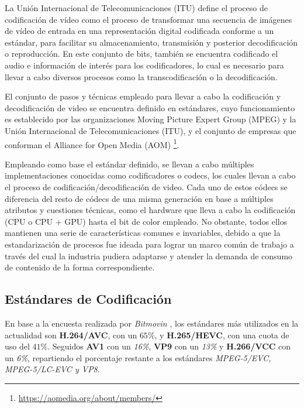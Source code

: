  La Unión Internacional de Telecomunicaciones (ITU) \cite{video-encoding-definition} define el proceso de codificación de vídeo como el proceso de transformar una secuencia de imágenes de vídeo de entrada en una representación digital codificada conforme a un estándar, para facilitar su almacenamiento, transmisión y posterior decodificación o reproducción. En este conjunto de bits, también se encuentra codificado el audio e información de interés para los codificadores, lo cual es necesario para llevar a cabo diversos procesos como la transcodificación o la decodificación. 

 El conjunto de pasos y técnicas empleado para llevar a cabo la codificación y decodificación de video se encuentra definido en estándares, cuyo funcionamiento es establecido por las organizaciones Moving Picture Expert Group (MPEG) y la Unión Internacional de Telecomunicaciones (ITU), y el conjunto de empresas que conforman el Alliance for Open Media (AOM) \footnote{\url{https://aomedia.org/about/members/}}.

 Empleando como base el estándar definido, se llevan a cabo múltiples implementaciones conocidas como codificadores o codecs, los cuales llevan a cabo el proceso de codificación/decodificación de video. Cada uno de estos códecs se diferencia del resto de códecs de una misma generación en base a múltiples atributos y cuestiones técnicas, como el hardware que lleva a cabo la codificación (CPU o CPU + GPU) hasta el bit de color empleado. No obstante, todos ellos mantienen una serie de características comunes e invariables, debido a que la estandarización de procesos fue ideada para lograr un marco común de trabajo a través del cual la industria pudiera adaptarse y atender la demanda de consumo de contenido de la forma correspondiente. 

\subsection{Estándares de Codificación}
 En base a la encuesta realizada por \textit{Bitmovin} \cite{bitmovin-9-report}, los estándares más utilizados en la actualidad son \textbf{H.264/AVC}, con un \textit{$65\%$}, y \textbf{H.265/HEVC}, con una cuota de uso del \textit{$41\%$}. Seguidos \textbf{AV1} con un \textit{16\%}, \textbf{VP9} con un \textit{13\%} y \textbf{H.266/VCC} con un \textit{6\%}, repartiendo el porcentaje restante a los estándares \textit{MPEG-5/EVC, MPEG-5/LC-EVC y VP8}. 

